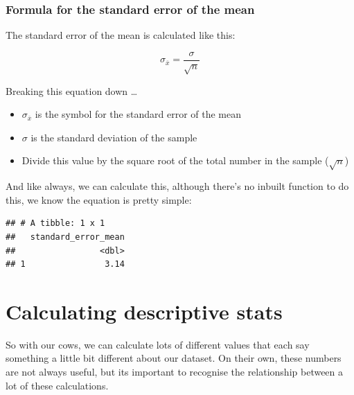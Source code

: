 \documentclass[
]{book}
\newenvironment{Shaded}{\begin{snugshade}}{\end{snugshade}}
\newcommand{\DataTypeTok}[1]{\textcolor[rgb]{0.13,0.29,0.53}{#1}}
\newcommand{\KeywordTok}[1]{\textcolor[rgb]{0.13,0.29,0.53}{\textbf{#1}}}
\newcommand{\NormalTok}[1]{#1}
\newcommand{\OperatorTok}[1]{\textcolor[rgb]{0.81,0.36,0.00}{\textbf{#1}}}
\newcommand{\StringTok}[1]{\textcolor[rgb]{0.31,0.60,0.02}{#1}}
\begin{document}
\hypertarget{formula-for-the-standard-error-of-the-mean}{%
\subsubsection{Formula for the standard error of the mean}\label{formula-for-the-standard-error-of-the-mean}}

The standard error of the mean is calculated like this:

\[\sigma_{\overline{x}} = \frac{\sigma}{\sqrt{n}} \]

\begin{translate}
Breaking this equation down \ldots{}

\begin{itemize}
\item
  \(\sigma_{\overline{x}}\) is the symbol for the standard error of the
  mean
\item
  \(\sigma\) is the standard deviation of the sample
\item
  Divide this value by the square root of the total number in the sample
  (\(\sqrt{n}\))
\end{itemize}
\end{translate}

And like always, we can calculate this, although there's no inbuilt function to do this, we know the equation is pretty simple:

\begin{Shaded}
\end{Shaded}

\begin{verbatim}
## # A tibble: 1 x 1
##   standard_error_mean
##                 <dbl>
## 1                3.14
\end{verbatim}

\hypertarget{calculating-descriptive-stats}{%
\section{Calculating descriptive stats}\label{calculating-descriptive-stats}}

So with our cows, we can calculate lots of different values that each say something a little bit different about our dataset. On their own, these numbers are not always useful, but its important to recognise the relationship between a lot of these calculations.
\end{document}
